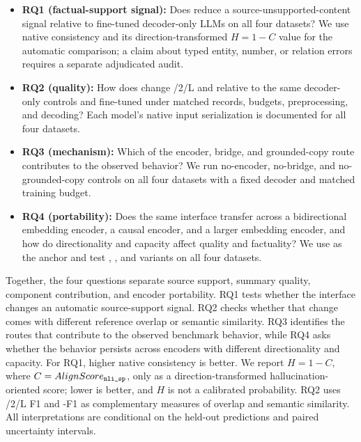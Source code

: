 \begin{itemize}
  \item \textbf{RQ1 (factual-support signal):} Does \EviSeq reduce a source-unsupported-content signal relative to fine-tuned decoder-only LLMs on all four datasets? We use native \AlignScore consistency and its direction-transformed $H=1-C$ value for the automatic comparison; a claim about typed entity, number, or relation errors requires a separate adjudicated audit.
  \item \textbf{RQ2 (quality):} How does \EviSeq change /2/L and \BERTScore relative to the same decoder-only controls and fine-tuned \TfiveGemma under matched records, budgets, preprocessing, and decoding? Each model's native input serialization is documented for all four datasets.
  \item \textbf{RQ3 (mechanism):} Which of the encoder, \AFMR bridge, and grounded-copy route contributes to the observed behavior? We run no-encoder, no-bridge, and no-grounded-copy controls on all four datasets with a fixed decoder and matched training budget.
  \item \textbf{RQ4 (portability):} Does the same interface transfer across a bidirectional embedding encoder, a causal encoder, and a larger embedding encoder, and how do directionality and capacity affect quality and factuality? We use \PPLXEmbed as the anchor and test \QwenCausal, \QwenEmbed, and \NemotronEmbed variants on all four datasets.
\end{itemize}

Together, the four questions separate source support, summary quality, component contribution, and encoder portability. RQ1 tests whether the interface changes an automatic source-support signal. RQ2 checks whether that change comes with different reference overlap or semantic similarity. RQ3 identifies the routes that contribute to the observed benchmark behavior, while RQ4 asks whether the behavior persists across encoders with different directionality and capacity. For RQ1, higher native \AlignScore consistency is better. We report $H=1-C$, where $C=AlignScore_{\texttt{nli\_sp}}$, only as a direction-transformed hallucination-oriented score; lower is better, and $H$ is not a calibrated probability. RQ2 uses /2/L F1 and \BERTScore-F1 as complementary measures of overlap and semantic similarity. All interpretations are conditional on the held-out predictions and paired uncertainty intervals.

